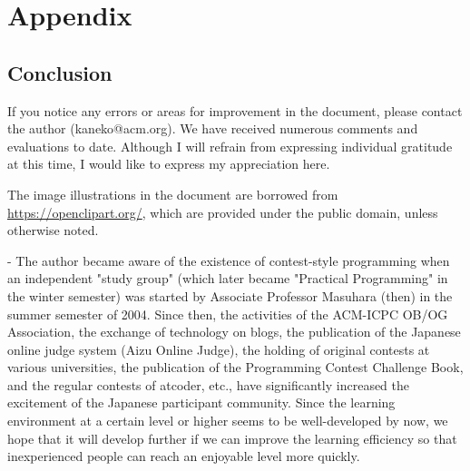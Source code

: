 \documentclass[report]{book}
\begin{document}

\part{Appendix}

\begin{versionoutside}
\chapter{Conclusion}
If you notice any errors or areas for improvement in the document, please contact the author (kaneko@acm.org). We have received numerous comments and evaluations to date. Although I will refrain from expressing individual gratitude at this time, I would like to express my appreciation here.

The image illustrations in the document are borrowed from \url{https://openclipart.org/}, which are provided under the public domain, unless otherwise noted.

\vfill

\begin{itembox}[r]{-}
The author became aware of the existence of contest-style programming when an independent "study group" (which later became "Practical Programming" in the winter semester) was started by Associate Professor Masuhara (then) in the summer semester of 2004. Since then, the activities of the ACM-ICPC OB/OG Association, the exchange of technology on blogs, the publication of the Japanese online judge system (Aizu Online Judge), the holding of original contests at various universities, the publication of the Programming Contest Challenge Book, and the regular contests of atcoder, etc., have significantly increased the excitement of the Japanese participant community. Since the learning environment at a certain level or higher seems to be well-developed by now, we hope that it will develop further if we can improve the learning efficiency so that inexperienced people can reach an enjoyable level more quickly.
\end{itembox}
\end{versionoutside}


\appendix
 
\end{document}

